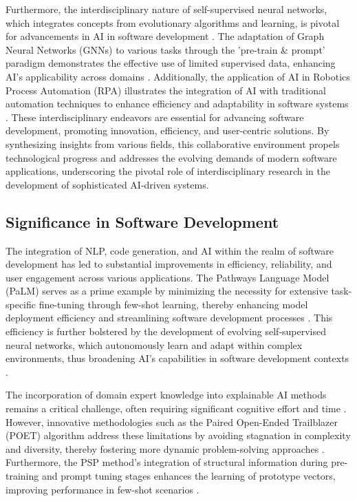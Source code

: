 Furthermore, the interdisciplinary nature of self-supervised neural networks, which integrates concepts from evolutionary algorithms and learning, is pivotal for advancements in AI in software development \cite{le2019evolvingselfsupervisedneuralnetworks}. The adaptation of Graph Neural Networks (GNNs) to various tasks through the 'pre-train & prompt' paradigm demonstrates the effective use of limited supervised data, enhancing AI's applicability across domains \cite{ge2024psppretrainingstructureprompt}. Additionally, the application of AI in Robotics Process Automation (RPA) illustrates the integration of AI with traditional automation techniques to enhance efficiency and adaptability in software systems \cite{pandy2024advancementsroboticsprocessautomation}. These interdisciplinary endeavors are essential for advancing software development, promoting innovation, efficiency, and user-centric solutions. By synthesizing insights from various fields, this collaborative environment propels technological progress and addresses the evolving demands of modern software applications, underscoring the pivotal role of interdisciplinary research in the development of sophisticated AI-driven systems.



\subsection{Significance in Software Development} \label{subsec:Significance in Software Development}

The integration of NLP, code generation, and AI within the realm of software development has led to substantial improvements in efficiency, reliability, and user engagement across various applications. The Pathways Language Model (PaLM) serves as a prime example by minimizing the necessity for extensive task-specific fine-tuning through few-shot learning, thereby enhancing model deployment efficiency and streamlining software development processes \cite{chowdhery2023palm}. This efficiency is further bolstered by the development of evolving self-supervised neural networks, which autonomously learn and adapt within complex environments, thus broadening AI's capabilities in software development contexts \cite{le2019evolvingselfsupervisedneuralnetworks}.



The incorporation of domain expert knowledge into explainable AI methods remains a critical challenge, often requiring significant cognitive effort and time \cite{chiaburu2024copronnconceptbasedprototypicalnearest}. However, innovative methodologies such as the Paired Open-Ended Trailblazer (POET) algorithm address these limitations by avoiding stagnation in complexity and diversity, thereby fostering more dynamic problem-solving approaches \cite{wang2019pairedopenendedtrailblazerpoet}. Furthermore, the PSP method's integration of structural information during pre-training and prompt tuning stages enhances the learning of prototype vectors, improving performance in few-shot scenarios \cite{ge2024psppretrainingstructureprompt}.



